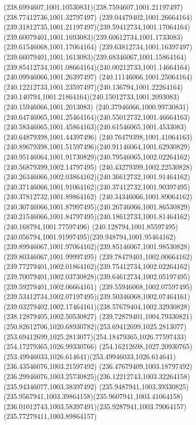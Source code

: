 {{  \curveto(238.6994607,1001.10530831)(238.7594607,1001.21197497)(238.77412736,1001.32797497)
  \curveto(239.04479402,1001.26664164)(239.31812735,1001.21197497)(239.59412734,1001.17064164)
  \curveto(239.60079401,1001.1693083)(239.60612734,1001.1733083)(239.61546068,1001.17064164)
  \curveto(239.63812734,1001.16397497)(239.66079401,1001.1613083)(239.68346067,1001.15864164)
  \curveto(239.85412734,1001.08664164)(240.00212733,1001.14664164)(240.09946066,1001.26397497)
  \curveto(240.11146066,1001.25064164)(240.12212733,1001.23597497)(240.136794,1001.22264164)
  \curveto(240.140794,1001.21864164)(240.15012733,1001.2093083)(240.15946066,1001.2013083)
  \curveto(240.37946066,1000.99730831)(240.64746065,1001.25464164)(240.55012732,1001.46664163)
  \curveto(240.58346065,1001.45864163)(240.61546065,1001.4533083)(240.64879398,1001.44397496)
  \curveto(240.76479398,1001.41064163)(240.89679398,1001.51597496)(240.91146064,1001.62930829)
  \curveto(240.95146064,1001.91730829)(240.79546065,1002.02264162)(240.56879399,1002.14797495)
  \curveto(240.43279399,1002.22530828)(240.26346066,1002.03864162)(240.36612732,1001.91464162)
  \curveto(240.37146066,1001.91064162)(240.37412732,1001.90397495)(240.37812732,1001.89864162)
  \curveto(240.34346066,1001.89064162)(240.30746066,1001.87997495)(240.26746066,1001.86530829)
  \curveto(240.21546066,1001.84797495)(240.18612733,1001.81464162)(240.168794,1001.77597496)
  \curveto(240.128794,1001.85597495)(240.056794,1001.91997495)(239.948794,1001.95464162)
  \curveto(239.89946067,1001.97064162)(239.85146067,1001.98530828)(239.80346067,1001.99997495)
  \curveto(239.78479401,1002.00664162)(239.77279401,1002.01864162)(239.75412734,1002.02264162)
  \curveto(239.70079401,1002.03730828)(239.64612734,1002.05197495)(239.59279401,1002.06664161)
  \curveto(239.55946068,1002.07597495)(239.53412734,1002.07197495)(239.50346068,1002.07464161)
  \curveto(239.03279402,1002.17464161)(238.57679404,1002.32930828)(238.12879405,1002.50530827)
  \curveto(239.72879401,1004.79330821)(250.82612706,1020.68930782)(253.69412699,1025.2813077)
  \curveto(253.69412699,1025.2813077)(254.18479365,1026.77597433)(254.17279365,1026.99330766)
  \curveto(254.16212698,1027.20930765)(253.49946033,1026.614641)(253.49946033,1026.614641)
  \lineto(236.43546076,1003.21597492)
  \lineto(236.47679409,1003.18797492)
  \curveto(236.29946076,1003.25730825)(236.12212743,1003.32264158)(235.94346077,1003.38397492)
  \curveto(235.9487941,1003.39330825)(235.9567941,1003.39864158)(235.9607941,1003.41064158)
  \curveto(236.01012743,1003.58397491)(235.9287941,1003.79064157)(235.77279411,1003.89864157)
}}
